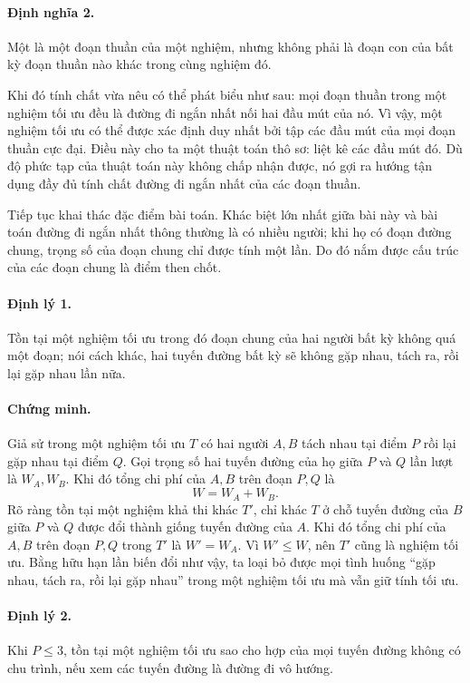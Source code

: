 \documentclass[11pt]{article}
\begin{document}
\paragraph{Định nghĩa 2.}
Một  là một đoạn thuần của một nghiệm, nhưng không
phải là đoạn con của bất kỳ đoạn thuần nào khác trong cùng nghiệm đó.

Khi đó tính chất vừa nêu có thể phát biểu như sau: mọi đoạn thuần trong một
nghiệm tối ưu đều là đường đi ngắn nhất nối hai đầu mút của nó. Vì vậy, một
nghiệm tối ưu có thể được xác định duy nhất bởi tập các đầu mút của mọi đoạn
thuần cực đại. Điều này cho ta một thuật toán thô sơ: liệt kê các đầu mút
đó. Dù độ phức tạp của thuật toán này không chấp nhận được, nó gợi ra hướng
tận dụng đầy đủ tính chất đường đi ngắn nhất của các đoạn thuần.

Tiếp tục khai thác đặc điểm bài toán. Khác biệt lớn nhất giữa bài này và bài
toán đường đi ngắn nhất thông thường là có nhiều người; khi họ có đoạn đường
chung, trọng số của đoạn chung chỉ được tính một lần. Do đó nắm được cấu trúc
của các đoạn chung là điểm then chốt.

\paragraph{Định lý 1.}
Tồn tại một nghiệm tối ưu trong đó đoạn chung của hai người bất kỳ không quá
một đoạn; nói cách khác, hai tuyến đường bất kỳ sẽ không gặp nhau, tách ra,
rồi lại gặp nhau lần nữa.

\paragraph{Chứng minh.}
Giả sử trong một nghiệm tối ưu $T$ có hai người $A,B$ tách nhau tại điểm $P$
rồi lại gặp nhau tại điểm $Q$. Gọi trọng số hai tuyến đường của họ giữa $P$
và $Q$ lần lượt là $W_A,W_B$. Khi đó tổng chi phí của $A,B$ trên đoạn
$P,Q$ là
\[
  W=W_A+W_B.
\]
Rõ ràng tồn tại một nghiệm khả thi khác $T'$, chỉ khác $T$ ở chỗ tuyến đường
của $B$ giữa $P$ và $Q$ được đổi thành giống tuyến đường của $A$. Khi đó tổng
chi phí của $A,B$ trên đoạn $P,Q$ trong $T'$ là $W'=W_A$. Vì $W'\le W$, nên
$T'$ cũng là nghiệm tối ưu. Bằng hữu hạn lần biến đổi như vậy, ta loại bỏ
được mọi tình huống ``gặp nhau, tách ra, rồi lại gặp nhau'' trong một nghiệm
tối ưu mà vẫn giữ tính tối ưu.

\paragraph{Định lý 2.}
Khi $P\le 3$, tồn tại một nghiệm tối ưu sao cho hợp của mọi tuyến đường không
có chu trình, nếu xem các tuyến đường là đường đi vô hướng.
\end{document}
